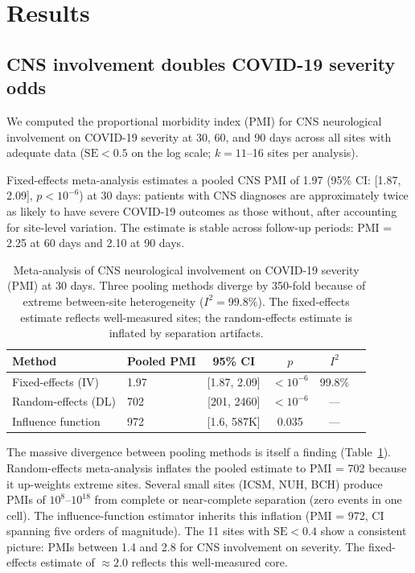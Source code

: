 \documentclass{article}
\begin{document}
\section{Results}

\subsection{CNS involvement doubles COVID-19 severity odds}

We computed the proportional morbidity index (PMI) for CNS neurological involvement on COVID-19 severity at 30, 60, and 90 days across all sites with adequate data ($\text{SE} < 0.5$ on the log scale; $k = 11$--16 sites per analysis).

Fixed-effects meta-analysis estimates a pooled CNS PMI of 1.97 (95\% CI: [1.87, 2.09], $p < 10^{-6}$) at 30 days: patients with CNS diagnoses are approximately twice as likely to have severe COVID-19 outcomes as those without, after accounting for site-level variation. The estimate is stable across follow-up periods: PMI = 2.25 at 60 days and 2.10 at 90 days.

\begin{table}[t]
\centering
\caption{Meta-analysis of CNS neurological involvement on COVID-19 severity (PMI) at 30 days. Three pooling methods diverge by 350-fold because of extreme between-site heterogeneity ($I^2 = 99.8\%$). The fixed-effects estimate reflects well-measured sites; the random-effects estimate is inflated by separation artifacts.}
\label{tab:meta}
\begin{tabular}{llcccc}
\toprule
Method & Pooled PMI & 95\% CI & $p$ & $I^2$ \\
\midrule
Fixed-effects (IV) & 1.97 & [1.87, 2.09] & $< 10^{-6}$ & 99.8\% \\
Random-effects (DL) & 702 & [201, 2460] & $< 10^{-6}$ & --- \\
Influence function & 972 & [1.6, 587K] & 0.035 & --- \\
\bottomrule
\end{tabular}
\end{table}

The massive divergence between pooling methods is itself a finding (Table~\ref{tab:meta}). Random-effects meta-analysis inflates the pooled estimate to PMI = 702 because it up-weights extreme sites. Several small sites (ICSM, NUH, BCH) produce PMIs of $10^{8}$--$10^{18}$ from complete or near-complete separation (zero events in one cell). The influence-function estimator inherits this inflation (PMI = 972, CI spanning five orders of magnitude). The 11 sites with $\text{SE} < 0.4$ show a consistent picture: PMIs between 1.4 and 2.8 for CNS involvement on severity. The fixed-effects estimate of $\approx 2.0$ reflects this well-measured core.
\end{document}
